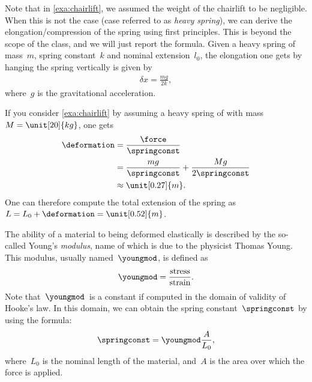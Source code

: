     Note that in \cref{exa:chairlift}, we assumed the weight of the chairlift to be negligible.
    When this is not the case (case referred to as \emph{heavy spring}), we can derive the elongation/compression of the spring using first principles.
    This is beyond the scope of the class, and we will just report the formula.
    Given a heavy spring of mass~$m$, spring constant~$k$ and nominal extension~$l_0$, the elongation one gets by hanging the spring vertically is given by
    \begin{equation}
        \begin{aligned}
            \delta x =\frac{m g}{2k},
        \end{aligned}
    \end{equation}
    where~$g$ is the gravitational acceleration.

    \begin{example}
        If you consider \cref{exa:chairlift} by assuming a heavy spring of with mass~$M=\unit[20]{kg}$, one gets
        \begin{equation}
            \begin{aligned}
                \deformation & =\frac{\force}{\springconst} \\
                             & =\frac{mg}{\springconst}+\frac{Mg}{2\springconst} \\
                             & \approx \unit[0.27]{m}.
            \end{aligned}
        \end{equation}
        One can therefore compute the total extension of the spring as~$L=L_0+\deformation=\unit[0.52]{m}$.
    \end{example}

    The ability of a material to being deformed elastically is described by the so-called Young's \emph{modulus}, name of which is due to the physicist Thomas Young.
    This modulus, usually named~$\youngmod$, is defined as
    \begin{equation}
        \youngmod=\frac{\text{stress}}{\text{strain}}.
    \end{equation}
    Note that~$\youngmod$~is a constant if computed in the domain of validity of Hooke's law.
    In this domain, we can obtain the spring constant~$\springconst$ by using the formula:
    \begin{equation}
        \springconst=\youngmod \frac{A}{L_0},
    \end{equation}
    where~$L_0$ is the nominal length of the material, and~$A$ is the area over which the force is applied.

